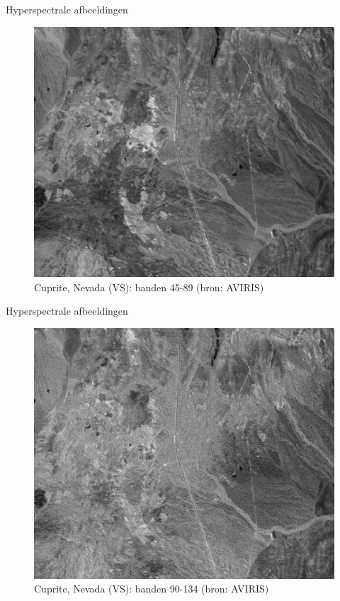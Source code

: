 \documentclass[t,12pt,dutch
\ifx\beamermode\undefined\else,\beamermode\fi
]{beamer}
\begin{document}
\begin{frame}{Hyperspectrale afbeeldingen}

\begin{figure}[H]
\centering
\includegraphics[scale=0.3]{images/cuprite_bands_45-89.png}
\caption{Cuprite, Nevada (VS): banden 45-89 (bron: AVIRIS)}
\end{figure}

\end{frame}

\begin{frame}{Hyperspectrale afbeeldingen}

\begin{figure}[H]
\centering
\includegraphics[scale=0.3]{images/cuprite_bands_90-134.png}
\caption{Cuprite, Nevada (VS): banden 90-134 (bron: AVIRIS)}
\end{figure}

\end{frame}
\end{document}
